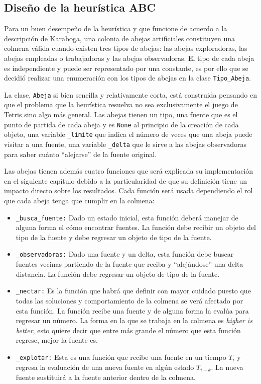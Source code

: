 

\subsection{Diseño de la heurística ABC}

Para un buen desempeño de la heurística y que funcione de acuerdo a la 
descripción de Karaboga, una colonia de abejas artificiales constituyen una 
colmena válida cuando existen tres tipos de abejas: las abejas exploradoras, 
las abejas empleadas o trabajadoras y las abejas observadoras. El tipo de 
cada abeja es independiente y puede ser representado por una constante, es por ello 
que se decidió realizar una enumeración con los tipos de abejas en 
la clase \texttt{Tipo\_Abeja}.

La clase, \texttt{Abeja} si bien sencilla y relativamente corta, está construida 
pensando en que el problema que la heurística resuelva no sea exclusivamente el 
juego de Tetris sino algo más general. Las abejas tienen un tipo, 
una fuente que es el punto de partida de cada abeja y es \texttt{None} al 
principio de la creación de cada objeto, una variable \texttt{\_limite} 
que indica el número de veces que una abeja puede visitar a una fuente, una 
variable \texttt{\_delta} que le sirve a las abejas observadoras para saber cuánto 
``alejarse'' de la fuente original.

Las abejas tienen además cuatro funciones que será explicada su implementación 
en el siguiente capítulo debido a la particularidad de que 
su definición tiene un impacto directo sobre los resultados. 
Cada función será usada dependiendo el rol 
que cada abeja tenga que cumplir en la colmena:

\begin{itemize}
\item \texttt{\_busca\_fuente:} Dado un estado inicial, esta función deberá 
manejar de alguna forma el cómo encontrar fuentes. La función debe recibir un objeto 
del tipo de la fuente y debe regresar un objeto de tipo de la fuente.

\item \texttt{\_observadoras:} Dado una fuente y un delta, esta función debe 
buscar fuentes vecinas partiendo de la fuente que reciba y ``alejándose'' una 
delta distancia. La función debe regresar un objeto de tipo de la fuente.

\item \texttt{\_nectar:} Es la función que habrá que definir con mayor cuidado 
puesto que todas las soluciones y comportamiento de la colmena se verá afectado 
por esta función. La función recibe una fuente y de alguna forma la evalúa para 
regresar un número. La forma en la que se trabaja en la colmena es \textit{higher 
is better}, esto quiere decir que entre más grande el número que esta función 
regrese, mejor la fuente es.

\item \texttt{\_explotar:} Esta es una función que recibe una fuente en un tiempo 
$T_{i}$ y regresa la evaluación de una nueva fuente en algún estado $T_{i+k}$. La nueva fuente 
sustituirá a la fuente anterior dentro de la colmena.
\end{itemize}

